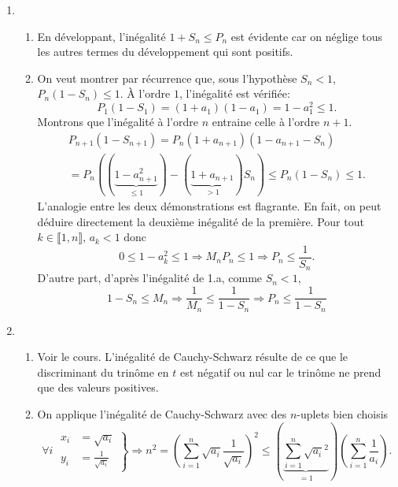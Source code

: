 \begin{enumerate}
\item 
\begin{enumerate}
 \item En développant, l'inégalité $1+S_n \leq P_n$ est évidente car on néglige tous les autres termes du développement qui sont positifs. 
 \item On veut montrer par récurrence que, sous l'hypothèse $S_n<1$, $P_n(1-S_n)\leq 1$.\newline
\`A l'ordre $1$, l'inégalité est vérifiée:
\[
 P_1(1-S_1) = (1+a_1)(1-a_1) = 1 - a_1^2 \leq 1.
\]
Montrons que l'inégalité à l'ordre $n$ entraine celle à l'ordre $n+1$.
\begin{multline*}
 P_{n+1}(1-S_{n+1}) = P_n(1+a_{n+1})\left( 1- a_{n+1} - S_n\right) \\
 = P_n\left( (\underset{\leq 1}{\underbrace{1-a_{n+1}^2}}) -(\underset{> 1}{\underbrace{1+a_{n+1}}})S_n\right) 
 \leq P_n(1-S_n) \leq 1.
\end{multline*}
L'analogie entre les deux démonstrations est flagrante.\newline
En fait, on peut déduire directement la deuxième inégalité de la première.\newline
Pour tout $k\in\llbracket 1,n \rrbracket$, $a_k<1$ donc 
\[
 0\leq  1 - a_k^2 \leq 1 \Rightarrow M_n P_n \leq 1 \Rightarrow P_n \leq \frac{1}{S_n}. 
\]
D'autre part, d'après  l'inégalité de 1.a, comme $S_n<1$,
\[
 1 - S_n \leq M_n \Rightarrow \frac{1}{M_n}\leq \frac{1}{1-S_n} \Rightarrow P_n \leq \frac{1}{1-S_n}
\]
\end{enumerate}
 \item 
 \begin{enumerate}
  \item Voir le cours. L'inégalité de Cauchy-Schwarz résulte de ce que le discriminant du trinôme en $t$ est négatif ou nul car le trinôme ne prend que des valeurs positives.
  \item On applique l'inégalité de Cauchy-Schwarz avec des $n$-uplets bien choisis
\[
\forall i\;  \left. 
\begin{aligned}
 x_i &= \sqrt{a_i} \\ y_i &= \frac{1}{\sqrt{a_i}}
\end{aligned}
\right\rbrace \Rightarrow
n^2 = \left( \sum_{i=1}^n \sqrt{a_i}\frac{1}{\sqrt{a_i}}\right)^2
\leq \left( \underset{ = 1}{\underbrace{\sum_{i=1}^n \sqrt{a_i}^2}}\right) \left( \sum_{i=1}^n \frac{1}{a_i}\right).
\]
 \end{enumerate}
\end{enumerate}

